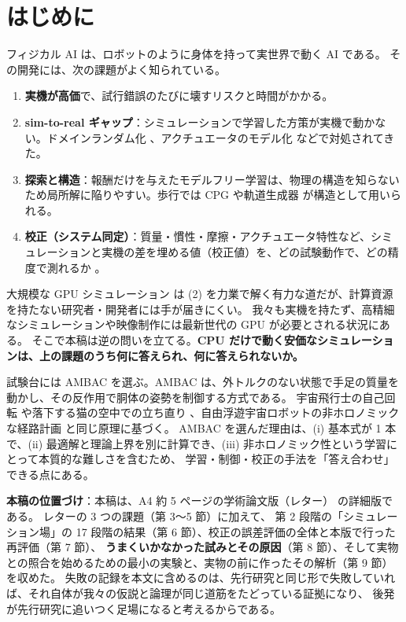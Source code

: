 \documentclass[paper=a4paper,fontsize=10pt,twocolumn,column_gap=2zw,line_length=24zw,number_of_lines=46,head_space=20mm]{jlreq}
\begin{document}
\section{はじめに}

フィジカル AI は、ロボットのように身体を持って実世界で動く AI である。
その開発には、次の課題がよく知られている。
\begin{enumerate}\setlength{\itemsep}{0pt}
\item \textbf{実機が高価}で、試行錯誤のたびに壊すリスクと時間がかかる。
\item \textbf{sim-to-real ギャップ}：シミュレーションで学習した方策が実機で動かない。ドメインランダム化 \cite{tobin2017,peng2018}、アクチュエータのモデル化 \cite{hwangbo2019} などで対処されてきた。
\item \textbf{探索と構造}：報酬だけを与えたモデルフリー学習は、物理の構造を知らないため局所解に陥りやすい。歩行では CPG \cite{ijspeert2008} や軌道生成器 \cite{iscen2018} が構造として用いられる。
\item \textbf{校正（システム同定）}：質量・慣性・摩擦・アクチュエータ特性など、シミュレーションと実機の差を埋める値（校正値）を、どの試験動作で、どの精度で測れるか \cite{atkeson1986,gautier1990}。
\end{enumerate}

大規模な GPU シミュレーション \cite{makoviychuk2021} は (2) を力業で解く有力な道だが、計算資源を持たない研究者・開発者には手が届きにくい。
我々も実機を持たず、高精細なシミュレーションや映像制作には最新世代の GPU が必要とされる状況にある。
そこで本稿は逆の問いを立てる。\textbf{CPU だけで動く安価なシミュレーションは、上の課題のうち何に答えられ、何に答えられないか。}

試験台には AMBAC を選ぶ。AMBAC は、外トルクのない状態で手足の質量を動かし、その反作用で胴体の姿勢を制御する方式である。
宇宙飛行士の自己回転 \cite{kane1970} や落下する猫の空中での立ち直り \cite{kane1969,montgomery1993}、自由浮遊宇宙ロボットの非ホロノミックな経路計画 \cite{nakamura1991} と同じ原理に基づく。
AMBAC を選んだ理由は、(i) 基本式が 1 本で、(ii) 最適解と理論上界を別に計算でき、(iii) 非ホロノミック性という学習にとって本質的な難しさを含むため、
学習・制御・校正の手法を「答え合わせ」できる点にある。

\textbf{本稿の位置づけ}：本稿は、A4 約 5 ページの学術論文版（レター）\cite{letter2026} の詳細版である。
レターの 3 つの課題（第 3〜5 節）に加えて、
第 2 段階の「シミュレーション場」の 17 段階の結果（第 6 節）、校正の誤差評価の全体と本版で行った再評価（第 7 節）、
\textbf{うまくいかなかった試みとその原因}（第 8 節）、そして実物との照合を始めるための最小の実験と、実物の前に作ったその解析（第 9 節）を収めた。
失敗の記録を本文に含めるのは、先行研究と同じ形で失敗していれば、それ自体が我々の仮説と論理が同じ道筋をたどっている証拠になり、
後発が先行研究に追いつく足場になると考えるからである。
\end{document}
